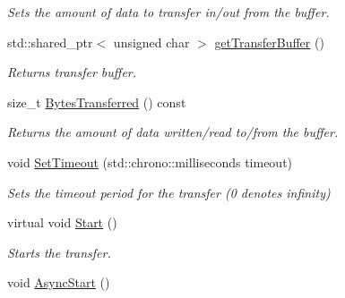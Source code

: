 \begin{DoxyCompactItemize}
\begin{DoxyCompactList}\small\item\em Sets the amount of data to transfer in/out from the buffer. \end{DoxyCompactList}\item 
\hypertarget{class_lib_u_s_b_1_1_transfer_af8bab95cfa16ca472e67ece211c3ff6d}{std\-::shared\-\_\-ptr$<$ unsigned char $>$ \hyperlink{class_lib_u_s_b_1_1_transfer_af8bab95cfa16ca472e67ece211c3ff6d}{get\-Transfer\-Buffer} ()}\label{class_lib_u_s_b_1_1_transfer_af8bab95cfa16ca472e67ece211c3ff6d}

\begin{DoxyCompactList}\small\item\em Returns transfer buffer. \end{DoxyCompactList}\item 
\hypertarget{class_lib_u_s_b_1_1_transfer_a1de8c97baaa813aa076c8feff25c8010}{size\-\_\-t \hyperlink{class_lib_u_s_b_1_1_transfer_a1de8c97baaa813aa076c8feff25c8010}{Bytes\-Transferred} () const }\label{class_lib_u_s_b_1_1_transfer_a1de8c97baaa813aa076c8feff25c8010}

\begin{DoxyCompactList}\small\item\em Returns the amount of data written/read to/from the buffer. \end{DoxyCompactList}\item 
\hypertarget{class_lib_u_s_b_1_1_transfer_af1b7c2aca86e4fa5d781e375132d9e32}{void \hyperlink{class_lib_u_s_b_1_1_transfer_af1b7c2aca86e4fa5d781e375132d9e32}{Set\-Timeout} (std\-::chrono\-::milliseconds timeout)}\label{class_lib_u_s_b_1_1_transfer_af1b7c2aca86e4fa5d781e375132d9e32}

\begin{DoxyCompactList}\small\item\em Sets the timeout period for the transfer (0 denotes infinity) \end{DoxyCompactList}\item 
\hypertarget{class_lib_u_s_b_1_1_transfer_ae871f26d99baaa9ec639e17bb3fd3fa8}{virtual void \hyperlink{class_lib_u_s_b_1_1_transfer_ae871f26d99baaa9ec639e17bb3fd3fa8}{Start} ()}\label{class_lib_u_s_b_1_1_transfer_ae871f26d99baaa9ec639e17bb3fd3fa8}

\begin{DoxyCompactList}\small\item\em Starts the transfer. \end{DoxyCompactList}\item 
\hypertarget{class_lib_u_s_b_1_1_transfer_a25c88d0e7f825f47bffa545b3109fcb3}{void \hyperlink{class_lib_u_s_b_1_1_transfer_a25c88d0e7f825f47bffa545b3109fcb3}{Async\-Start} ()}\label{class_lib_u_s_b_1_1_transfer_a25c88d0e7f825f47bffa545b3109fcb3}


\end{DoxyCompactItemize}
